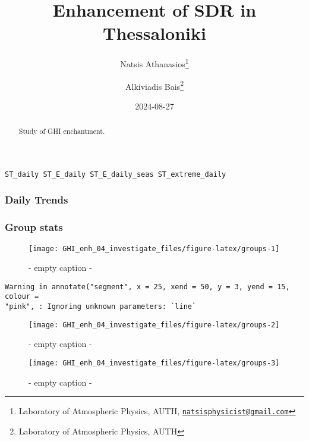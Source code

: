 \documentclass[
  10pt,
  a4paper,oneside]{article}
\title{Enhancement of SDR in Thessaloniki}
\author{Natsis Athanasios\footnote{Laboratory of Atmospheric Physics, AUTH, \href{mailto:natsisphysicist@gmail.com}{\nolinkurl{natsisphysicist@gmail.com}}} \and Alkiviadis Bais\footnote{Laboratory of Atmospheric Physics, AUTH}}
\date{2024-08-27}
\begin{document}
\maketitle
\begin{abstract}
Study of GHI enchantment.
\end{abstract}

{
\hypersetup{linkcolor=}
\setcounter{tocdepth}{4}
\tableofcontents
}
\begin{verbatim}
ST_daily ST_E_daily ST_E_daily_seas ST_extreme_daily
\end{verbatim}

\newpage
\FloatBarrier

\hypertarget{daily-trends}{%
\subsubsection{Daily Trends}\label{daily-trends}}

\newpage
\FloatBarrier

\hypertarget{group-stats}{%
\subsubsection{Group stats}\label{group-stats}}

\begin{figure}[H]

{\centering \texttt{[image: GHI\_enh\_04\_investigate\_files/figure-latex/groups-1]} 

}

\caption{ - empty caption - }\label{fig:groups-1}
\end{figure}

\begin{verbatim}
Warning in annotate("segment", x = 25, xend = 50, y = 3, yend = 15, colour =
"pink", : Ignoring unknown parameters: `line`
\end{verbatim}

\begin{figure}[H]

{\centering \texttt{[image: GHI\_enh\_04\_investigate\_files/figure-latex/groups-2]} 

}

\caption{ - empty caption - }\label{fig:groups-2}
\end{figure}
\begin{figure}[H]

{\centering \texttt{[image: GHI\_enh\_04\_investigate\_files/figure-latex/groups-3]} 

}

\caption{ - empty caption - }\label{fig:groups-3}
\end{figure}
\end{document}
